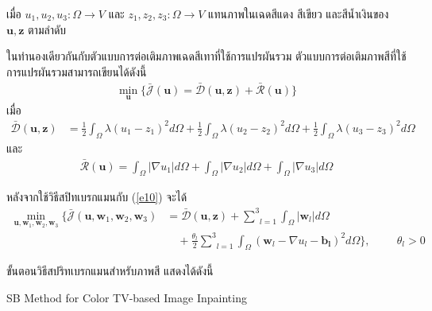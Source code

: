 \documentclass[hidelinks, a4paper,12pt]{article}
\numberwithin{equation}{section}							%
\numberwithin{equation}{section}
\begin{document}
{\noindent เมื่อ $u_1,u_2,u_3: \Omega  \rightarrow V$ และ $z_1,z_2,z_3: \Omega  \rightarrow V$ แทนภาพในเฉดสีแดง สีเขียว และสีน้ำเงินของ $\boldsymbol{u},\boldsymbol{z}$ ตามลำดับ 

\hspace{1cm} ในทำนองเดียวกันกับตัวแบบการต่อเติมภาพเฉดสีเทาที่ใช้การแปรผันรวม ตัวแบบการต่อเติมภาพสีที่ใช้การแปรผันรวมสามารถเขียนได้ดังนี้
\begin{align}
\min_{\boldsymbol{u}} \{ \bar{\mathcal{J}}(\boldsymbol{u})= \mathcal{\bar{D}}(\boldsymbol{u},\boldsymbol{z})+  \mathcal{\bar{R}}(\boldsymbol{u}) \}
\label{e10}
\end{align}
เมื่อ
\begin{align*}
\mathcal{\bar{D}}(\boldsymbol{u},\boldsymbol{z}) 
&= \frac{1}{2}\int_{\Omega}^{}\lambda(u_1 - z_1)^2 d\Omega + \frac{1}{2}\int_{\Omega}^{}\lambda(u_2 - z_2)^2 d\Omega + \frac{1}{2}\int_{\Omega}^{}\lambda(u_3 - z_3)^2 d\Omega
\end{align*}
และ 
\begin{align*}
\mathcal{\bar{R}}(\boldsymbol{u})= \int_{\Omega}^{}\lvert\nabla u_1 \rvert d\Omega + \int_{\Omega}^{}\lvert\nabla u_2 \rvert d\Omega + \int_{\Omega}^{}\lvert\nabla u_3 \rvert d\Omega
\end{align*}

\hspace{1cm}  หลังจากใช้วิธีสปิทเบรกแมนกับ (\ref{e10}) จะได้
\begin{align}
\min_{\boldsymbol{u},\boldsymbol{w}_1,\boldsymbol{w}_2,\boldsymbol{w}_3} \{\bar{\mathcal{J}}(\boldsymbol{u},\boldsymbol{w}_1,\boldsymbol{w}_2,\boldsymbol{w}_3)&= \mathcal{\bar{D}}(\boldsymbol{u},\boldsymbol{z}) +  \underset{l=1}{\overset{3}{\sum}} \int_{\Omega}^{}|\boldsymbol{w}_l|d\Omega
\nonumber\\
&\quad+ \frac{\theta_l}{2} \underset{l=1}{\overset{3}{\sum}}\int_{\Omega}^{}(\boldsymbol{w}_l - \nabla u_l - \boldsymbol{b_l})^{2}d\Omega\}, \hspace{1cm} \theta_l > 0
\end{align}

\vspace{1cm}
\hspace{1cm}ขั้นตอนวิธีสปริทเบรกแมนสำหรับภาพสี แสดงได้ดังนี้ 
\vspace{0.5cm}

\begin{algorithm}[H]
	\SetAlgoNoLine
	\caption{SB Method for Color TV-based Image Inpainting}
\end{algorithm}
\vspace{1cm}
}
\end{document}
